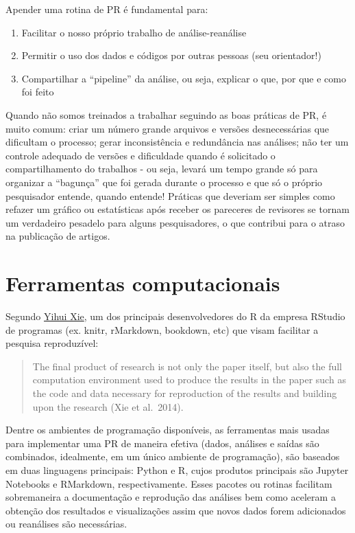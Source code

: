 \documentclass[]{book}
\providecommand{\tightlist}{%
  \setlength{\itemsep}{0pt}\setlength{\parskip}{0pt}}
\begin{document}
Apender uma rotina de PR é fundamental para:

\begin{enumerate}
\def\labelenumi{\arabic{enumi})}
\tightlist
\item
  Facilitar o nosso próprio trabalho de análise-reanálise
\item
  Permitir o uso dos dados e códigos por outras pessoas (seu
  orientador!)
\item
  Compartilhar a ``pipeline'' da análise, ou seja, explicar o que, por
  que e como foi feito
\end{enumerate}

Quando não somos treinados a trabalhar seguindo as boas práticas de PR,
é muito comum: criar um número grande arquivos e versões desnecessárias
que dificultam o processo; gerar inconsistência e redundância nas
análises; não ter um controle adequado de versões e dificuldade quando é
solicitado o compartilhamento do trabalhos - ou seja, levará um tempo
grande só para organizar a ``bagunça'' que foi gerada durante o processo
e que só o próprio pesquisador entende, quando entende! Práticas que
deveriam ser simples como refazer um gráfico ou estatísticas após
receber os pareceres de revisores se tornam um verdadeiro pesadelo para
alguns pesquisadores, o que contribui para o atraso na publicação de
artigos.

\hypertarget{ferramentas-computacionais}{%
\section{Ferramentas computacionais}\label{ferramentas-computacionais}}

Segundo \href{https://yihui.name}{Yihui Xie}, um dos principais
desenvolvedores do R da empresa RStudio de programas (ex. knitr,
rMarkdown, bookdown, etc) que visam facilitar a pesquisa reproduzível:

\begin{quote}
The final product of research is not only the paper itself, but also the
full computation environment used to produce the results in the paper
such as the code and data necessary for reproduction of the results and
building upon the research (Xie et al.~2014).
\end{quote}

Dentre os ambientes de programação disponíveis, as ferramentas mais
usadas para implementar uma PR de maneira efetiva (dados, análises e
saídas são combinados, idealmente, em um único ambiente de programação),
são baseados em duas linguagens principais: Python e R, cujos produtos
principais são Jupyter Notebooks e RMarkdown, respectivamente. Esses
pacotes ou rotinas facilitam sobremaneira a documentação e reprodução
das análises bem como aceleram a obtenção dos resultados e visualizações
assim que novos dados forem adicionados ou reanálises são necessárias.
\end{document}
